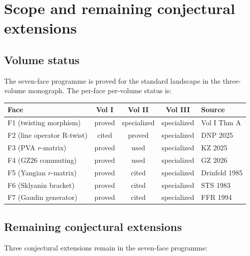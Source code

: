\documentclass[11pt]{article}
\theoremstyle{plain}
\theoremstyle{definition}
\theoremstyle{remark}
\begin{document}

\section{Scope and remaining conjectural extensions}\label{sec:status}

\subsection{Volume status}

The seven-face programme is proved for the standard landscape in
the three-volume monograph. The per-face per-volume status is:

\begin{center}
\renewcommand{\arraystretch}{1.3}
\begin{tabular}{|l|c|c|c|l|}
\hline
\textbf{Face} & \textbf{Vol I} & \textbf{Vol II} & \textbf{Vol III}
 & \textbf{Source} \\
\hline\hline
F1 (twisting morphism) & proved & specialized & specialized
 & Vol I Thm A \\
\hline
F2 (line operator R-twist) & cited & proved & specialized
 & DNP 2025 \\
\hline
F3 (PVA $r$-matrix) & proved & used & specialized
 & KZ 2025 \\
\hline
F4 (GZ26 commuting) & proved & used & specialized
 & GZ 2026 \\
\hline
F5 (Yangian $r$-matrix) & proved & cited & specialized
 & Drinfeld 1985 \\
\hline
F6 (Sklyanin bracket) & proved & cited & specialized
 & STS 1983 \\
\hline
F7 (Gaudin generator) & proved & cited & specialized
 & FFR 1994 \\
\hline
\end{tabular}
\end{center}

\subsection{Remaining conjectural extensions}

Three conjectural extensions remain in the seven-face programme:
\end{document}
